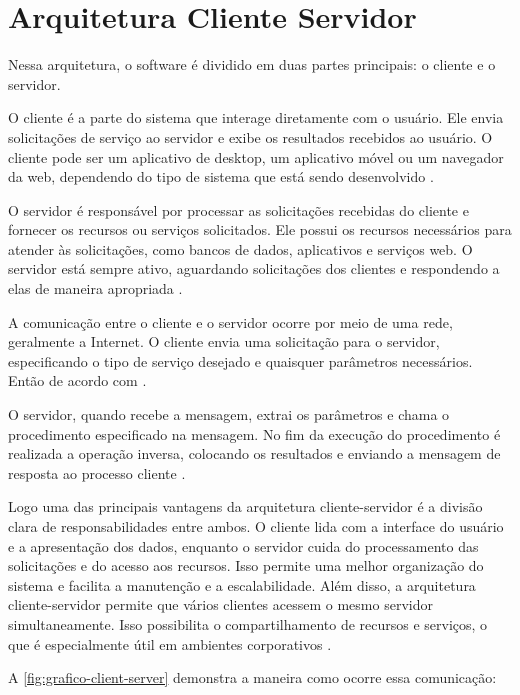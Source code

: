 \section{Arquitetura Cliente Servidor}
Nessa arquitetura, o software é dividido em duas partes principais: o cliente e o servidor.

O cliente é a parte do sistema que interage diretamente com o usuário. Ele envia solicitações de serviço ao servidor e exibe os resultados recebidos ao usuário. O cliente pode ser um aplicativo de desktop, um aplicativo móvel ou um navegador da web, dependendo do tipo de sistema que está sendo desenvolvido \cite{flanagan2012javascript}.

O servidor é responsável por processar as solicitações recebidas do cliente e fornecer os recursos ou serviços solicitados. Ele possui os recursos necessários para atender às solicitações, como bancos de dados, aplicativos e serviços web. O servidor está sempre ativo, aguardando solicitações dos clientes e respondendo a elas de maneira apropriada \cite{arqClientServer2}.

A comunicação entre o cliente e o servidor ocorre por meio de uma rede, geralmente a Internet. O cliente envia uma solicitação para o servidor, especificando o tipo de serviço desejado e quaisquer parâmetros necessários.
Então de acordo com .
\begin{citacao}
O servidor, quando recebe a mensagem, extrai os parâmetros 
e chama o procedimento especificado na mensagem. No fim da execução do procedimento é 
realizada a operação inversa, colocando os resultados e enviando a mensagem de resposta ao 
processo cliente \cite{arqClientServer2}.
\end{citacao}

    Logo uma das principais vantagens da arquitetura cliente-servidor é a divisão clara de responsabilidades entre ambos. 
O cliente lida com a interface do usuário e a apresentação dos dados, enquanto o servidor cuida do processamento das solicitações e do acesso aos recursos. Isso permite uma melhor organização do sistema e facilita a manutenção e a escalabilidade.
Além disso, a arquitetura cliente-servidor permite que vários clientes acessem o mesmo servidor simultaneamente. Isso possibilita o compartilhamento de recursos e serviços, o que é especialmente útil em ambientes corporativos \cite{arqClientServer2}.

A \autoref{fig:grafico-client-server} demonstra a maneira como ocorre essa comunicação:

